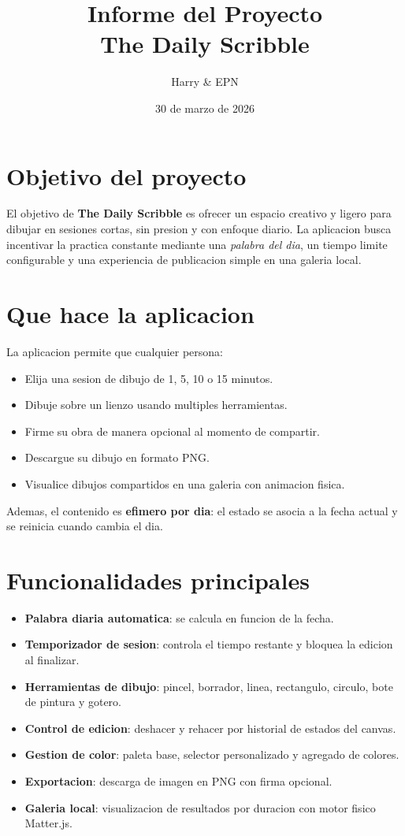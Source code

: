 \documentclass[12pt,a4paper]{article}
\title{Informe del Proyecto\\\large The Daily Scribble}
\author{Harry \& EPN}
\date{30 de marzo de 2026}
\begin{document}
\maketitle

\section{Objetivo del proyecto}
El objetivo de \textbf{The Daily Scribble} es ofrecer un espacio creativo y ligero para dibujar en sesiones cortas, sin presion y con enfoque diario. La aplicacion busca incentivar la practica constante mediante una \textit{palabra del dia}, un tiempo limite configurable y una experiencia de publicacion simple en una galeria local.

\section{Que hace la aplicacion}
La aplicacion permite que cualquier persona:
\begin{itemize}[leftmargin=*]
  \item Elija una sesion de dibujo de 1, 5, 10 o 15 minutos.
  \item Dibuje sobre un lienzo usando multiples herramientas.
  \item Firme su obra de manera opcional al momento de compartir.
  \item Descargue su dibujo en formato PNG.
  \item Visualice dibujos compartidos en una galeria con animacion fisica.
\end{itemize}

Ademas, el contenido es \textbf{efimero por dia}: el estado se asocia a la fecha actual y se reinicia cuando cambia el dia.

\section{Funcionalidades principales}
\begin{itemize}[leftmargin=*]
  \item \textbf{Palabra diaria automatica}: se calcula en funcion de la fecha.
  \item \textbf{Temporizador de sesion}: controla el tiempo restante y bloquea la edicion al finalizar.
  \item \textbf{Herramientas de dibujo}: pincel, borrador, linea, rectangulo, circulo, bote de pintura y gotero.
  \item \textbf{Control de edicion}: deshacer y rehacer por historial de estados del canvas.
  \item \textbf{Gestion de color}: paleta base, selector personalizado y agregado de colores.
  \item \textbf{Exportacion}: descarga de imagen en PNG con firma opcional.
  \item \textbf{Galeria local}: visualizacion de resultados por duracion con motor fisico Matter.js.
\end{itemize}
\end{document}
